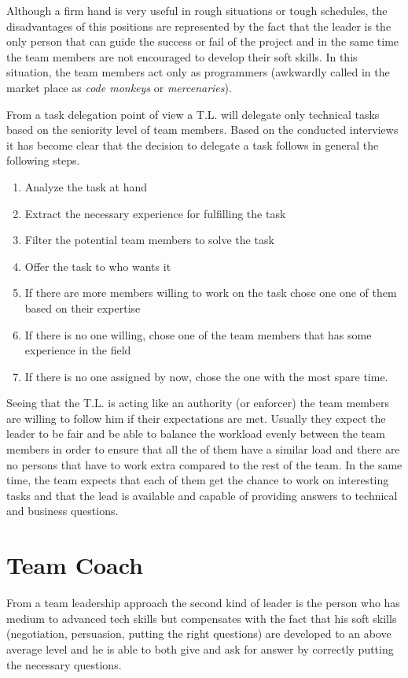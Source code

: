 Although a firm hand is very useful in rough situations or tough schedules, the disadvantages of this positions are represented by the fact that the leader is the only person that can guide the success or fail of the project and in the same time the team members are not encouraged to develop their soft skills. In this situation, the team members act only as programmers (awkwardly called in the market place as \textit{code monkeys} or \textit{mercenaries}).

From a task delegation point of view a T.L. will delegate only technical tasks based on the seniority level of team members. Based on the conducted interviews it has become clear that the decision to delegate a task follows in general the following steps.
\begin{enumerate}
\item Analyze the task at hand
\item Extract the necessary experience for fulfilling the task
\item Filter the potential team members to solve the task
\item Offer the task to who wants it
\item If there are more members willing to work on the task chose one one of them based on their expertise
\item If there is no one willing, chose one of the team members that has some experience in the field
\item If there is no one assigned by now, chose the one with the most spare time.
\end{enumerate}

Seeing that the T.L. is acting like an authority (or enforcer) the team members are willing to follow him if their expectations are met. Usually they expect the leader to be fair and be able to balance the workload evenly between the team members in order to ensure that all the of them have a similar load and there are no persons that have to work extra compared to the rest of the team. In the same time, the team expects that each of them get the chance to work on interesting tasks and that the lead is available and capable of providing answers to technical and business questions.

\section{Team Coach}
\label{sec:team-coach}
From a team leadership approach the second kind of leader is the person who has medium to advanced tech skills but compensates with the fact that his soft skills (negotiation, persuasion, putting the right questions) are developed to an above average level and he is able to both give and ask for answer by correctly putting the necessary questions.

